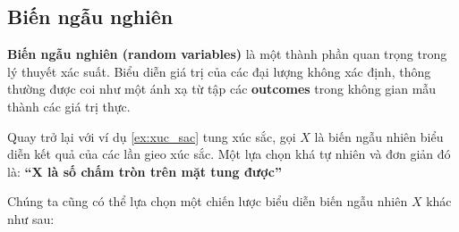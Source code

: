 \documentclass[../main-report.tex]{subfiles}
\begin{document}
%

\subsection{Biến ngẫu nghiên}
\textbf{Biến ngẫu nghiên (random variables)} là một thành phần quan trọng trong lý thuyết xác suất. Biểu diễn giá trị của các đại lượng không xác định, thông thường được coi như một ánh xạ từ tập các \textbf{outcomes} trong không gian mẫu thành các giá trị thực.


Quay trở lại với ví dụ \ref{ex:xuc_sac} tung xúc sắc, gọi $X$ là biến ngẫu nhiên biểu diễn kết quả của các lần gieo xúc sắc. Một lựa chọn khá tự nhiên và đơn giản đó là: \textbf{``$\boldsymbol{X}$ là số chấm tròn trên mặt tung được''}

Chúng ta cũng có thể lựa chọn một chiến lược biểu diễn biến ngẫu nhiên $X$ khác như sau:
\end{document}
